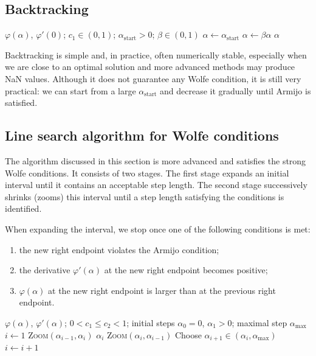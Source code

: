 \subsection{Backtracking}
\begin{algorithm}[ht]
  \caption{\textsc{Backtracking}}
  \label{alg:backtracking}
  \begin{algorithmic}
    \REQUIRE $\varphi(\alpha)$, $\varphi'(0)$; $c_1\in(0,1)$; $\alpha_{\mathrm{start}}>0$; $\beta\in(0,1)$
    \STATE $\alpha\gets \alpha_{\mathrm{start}}$
      \STATE $\alpha\gets \beta \alpha$
    \ENDWHILE
    \RETURN $\alpha$
  \end{algorithmic}
\end{algorithm}

\noindent Backtracking is simple and, in practice, often numerically stable, especially when
we are close to an optimal solution and more advanced methods may produce NaN values.
Although it does not guarantee any Wolfe condition, it is still very practical: we can start
from a large $\alpha_{\mathrm{start}}$ and decrease it gradually until Armijo is satisfied.
\subsection{Line search algorithm for Wolfe conditions}
The algorithm discussed in this section is more advanced and satisfies the strong Wolfe conditions.
It consists of two stages. The first stage expands an initial interval until it contains an
acceptable step length. The second stage successively shrinks (zooms) this interval until a step
length satisfying the conditions is identified.

When expanding the interval, we stop once one of the following conditions is met:
\begin{enumerate}
  \item the new right endpoint violates the Armijo condition;
  \item the derivative $\varphi'(\alpha)$ at the new right endpoint becomes positive;
  \item $\varphi(\alpha)$ at the new right endpoint is larger than at the previous right endpoint.
\end{enumerate}
\begin{algorithm}[ht]
  \caption{\textsc{Expand}}
  \label{alg:expand}
  \begin{algorithmic}
    \REQUIRE $\varphi(\alpha)$, $\varphi'(\alpha)$; $0<c_1\le c_2<1$; initial
    steps $\alpha_0=0$, $\alpha_1>0$; maximal step $\alpha_{\max}$
    \STATE $i\gets 1$
        \RETURN \textsc{Zoom}$(\alpha_{i-1},\alpha_i)$
      \ENDIF
        \RETURN $\alpha_i$
      \ENDIF
        \RETURN \textsc{Zoom}$(\alpha_i,\alpha_{i-1})$
      \ENDIF
      \STATE Choose $\alpha_{i+1}\in(\alpha_i,\alpha_{\max})$
      \STATE $i\gets i+1$
    \ENDWHILE
  \end{algorithmic}
\end{algorithm}

